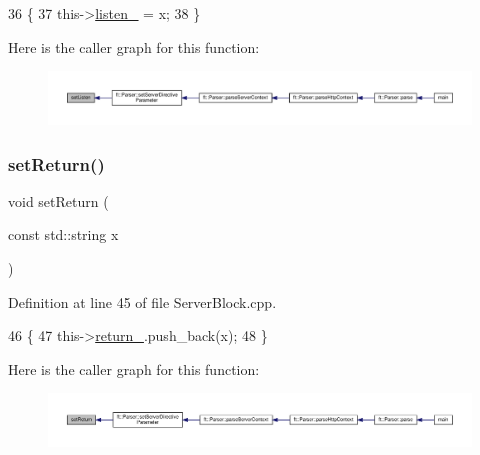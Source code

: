 \begin{DoxyCode}
36     \{
37         this->\hyperlink{classft_1_1_server_block_a5105357e893dd34d8e22d48def2fbafa}{listen\_} = x;
38     \}
\end{DoxyCode}
Here is the caller graph for this function\+:
\nopagebreak
\begin{figure}[H]
\begin{center}
\leavevmode
\includegraphics[width=350pt]{classft_1_1_server_block_a0f0253aecea7200c5b8dabdfff638909_icgraph}
\end{center}
\end{figure}
\mbox{\label{classft_1_1_server_block_a041d07c701e052b114ef353d5e588998}} 
\subsubsection{\texorpdfstring{set\+Return()}{setReturn()}}
{\footnotesize\ttfamily void set\+Return (\begin{DoxyParamCaption}\item[{const std\+::string}]{x }\end{DoxyParamCaption})}



Definition at line 45 of file Server\+Block.\+cpp.


\begin{DoxyCode}
46     \{
47         this->\hyperlink{classft_1_1_server_block_abab721f365aff66f8a1289de21c8f01f}{return\_}.push\_back(x);
48     \}
\end{DoxyCode}
Here is the caller graph for this function\+:
\nopagebreak
\begin{figure}[H]
\begin{center}
\leavevmode
\includegraphics[width=350pt]{classft_1_1_server_block_a041d07c701e052b114ef353d5e588998_icgraph}
\end{center}
\end{figure}
\mbox{\label{classft_1_1_base_directives_a2a7990e309f7e38f2915dbbb0d2704cf}} 
